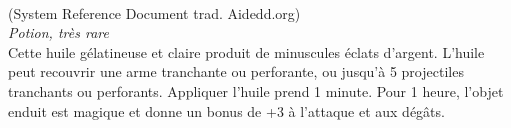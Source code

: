 \\
{\small (System Reference Document trad. Aidedd.org)}\\
{\small \it Potion, très rare}\\
Cette huile gélatineuse et claire produit de minuscules éclats d'argent. L’huile peut recouvrir une arme tranchante ou perforante, ou jusqu'à 5 projectiles tranchants ou perforants. Appliquer l’huile prend 1 minute. Pour 1 heure, l’objet enduit est magique et donne un bonus de +3 à l’attaque et aux dégâts. \\

